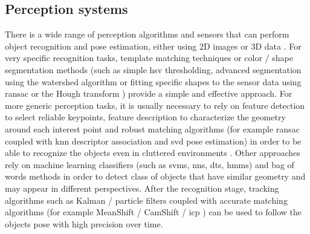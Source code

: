 %



\subsection{Perception systems}

There is a wide range of perception algorithms and sensors that can perform object recognition \cite{Andreopoulos2013} and pose estimation, either using 2D images \cite{Marton2011,Costa2016ICARSC} or 3D data \cite{Aldoma2011,Wohlkinger2012,Lee2012,Blodow2014phd,Garcia2016}. For very specific recognition tasks, template matching techniques \cite{Lee2016} or color / shape segmentation methods (such as simple \gls{hsv} thresholding, advanced segmentation using the watershed algorithm or fitting specific shapes to the sensor data using \gls{ransac} or the Hough transform \cite{Ballard1981}) provide a simple and effective approach. For more generic perception tasks, it is usually necessary to rely on feature detection \cite{Tuytelaars2008,Filipe2014} to select reliable keypoints, feature description \cite{Gauglitz2011,Hansch2014} to characterize the geometry around each interest point and robust matching algorithms (for example \gls{ransac} coupled with \gls{knn} descriptor association and \gls{svd} pose estimation) in order to be able to recognize the objects even in cluttered environments \cite{Aldoma2016}. Other approaches rely on machine learning classifiers \cite{Rocha2015} (such as \glspl{svm}, \glspl{nn}, \glspl{dt}, \glspl{hmm}) and bag of words methods \cite{Csurka04,Nowak2006,Costa2018} in order to detect class of objects that have similar geometry and may appear in different perspectives. After the recognition stage, tracking algorithms such as Kalman \cite{Kalman1960} / particle filters \cite{Cho2006} coupled with accurate matching algorithms (for example MeanShift / CamShift \cite{Bradski1998} / \gls{icp} \cite{Besl1992}) can be used to follow the objects pose with high precision over time.

